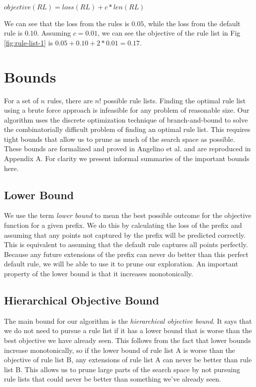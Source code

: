 \begin{math}
objective(RL) = loss(RL) + c * len(RL)
\end{math}

We can see that the loss from the rules is $0.05$, while the loss from the default rule is $0.10$.
Assuming $c=0.01$, we can see the objective of the rule list in Fig \ref{fig:rule-list-1} is $0.05 + 0.10 + 2 * 0.01 = 0.17$.

\section{Bounds}\label{sec:bounds}
For a set of $n$ rules, there are $n!$ possible rule lists.
Finding the optimal rule list using a brute force approach is infeasible for any problem of reasonable size.
Our algorithm uses the discrete optimization technique of branch-and-bound to solve the combinatorially difficult problem of finding an optimal rule list.
This requires tight bounds that allow us to prune as much of the search space as possible.
These bounds are formalized and proved in Angelino et al. \cite{AngelinoLaAlSeRu17} and are reproduced in Appendix A.
For clarity we present informal summaries of the important bounds here.

\subsection{Lower Bound}
We use the term \textit{lower bound} to mean the best possible outcome for the objective function for a given prefix.
We do this by calculating the loss of the prefix and assuming that any points not captured by the prefix will be predicted correctly.
This is equivalent to assuming that the default rule captures all points perfectly.
Because any future extensions of the prefix can never do better than this perfect default rule, we will be able to use it to prune our exploration.
An important property of the lower bound is that it increases monotonically.

\subsection{Hierarchical Objective Bound}
The main bound for our algorithm is the \textit{hierarchical objective bound}. 
It says that we do not need to pursue a rule list if it has a lower bound that is worse than the best objective we have already seen.
This follows from the fact that lower bounds increase monotonically, so if the lower bound of rule list A is worse than the objective of rule list B, any extensions of rule list A can never be better than rule list B.
This allows us to prune large parts of the search space by not pursuing rule lists that could never be better than something we've already seen.

